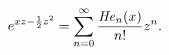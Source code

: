 \[e^{xz-\frac{1}{2}z^{2}}=\sum_{n=0}^{\infty}\frac{\mathop{\mathit{He}_{n}\/}%
\nolimits\!\left(x\right)}{n!}z^{n}.\]